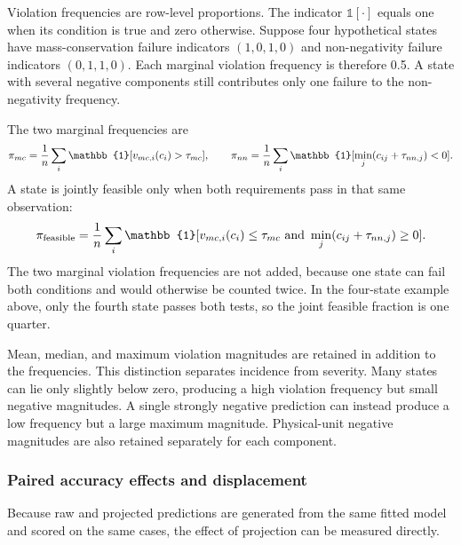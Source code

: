 Violation frequencies are row-level proportions. The indicator $\mathbb{1}[\cdot]$ equals one when its condition is true and zero otherwise. Suppose four hypothetical states have mass-conservation failure indicators $(1,0,1,0)$ and non-negativity failure indicators $(0,1,1,0)$. Each marginal violation frequency is therefore 0.5. A state with several negative components still contributes only one failure to the non-negativity frequency.

The two marginal frequencies are
\begin{equation}
\equationname{Mass conservation and non-negativity violation frequencies}
\pi_{mc}=
\frac{1}{n}\sum_i\mathbb{1}[v_{mc,i}(c_i)>\tau_{mc}],\qquad
\pi_{nn}=
\frac{1}{n}\sum_i\mathbb{1}[\min_j(c_{ij}+\tau_{nn,j})<0].
\label{eq:projection_violation_rates}
\end{equation}
A state is jointly feasible only when both requirements pass in that same observation:
\begin{equation}
\equationname{Jointly feasible fraction of assessed component states}
\pi_{\mathrm{feasible}}=
\frac{1}{n}\sum_i\mathbb{1}
[v_{mc,i}(c_i)\leq\tau_{mc}\ \text{and}\ 
\min_j(c_{ij}+\tau_{nn,j})\geq0].
\label{eq:projection_feasible_fraction}
\end{equation}
The two marginal violation frequencies are not added, because one state can fail both conditions and would otherwise be counted twice. In the four-state example above, only the fourth state passes both tests, so the joint feasible fraction is one quarter.

Mean, median, and maximum violation magnitudes are retained in addition to the frequencies. This distinction separates incidence from severity. Many states can lie only slightly below zero, producing a high violation frequency but small negative magnitudes. A single strongly negative prediction can instead produce a low frequency but a large maximum magnitude. Physical-unit negative magnitudes are also retained separately for each component.

\subsubsection{Paired accuracy effects and displacement}

Because raw and projected predictions are generated from the same fitted model and scored on the same cases, the effect of projection can be measured directly.

